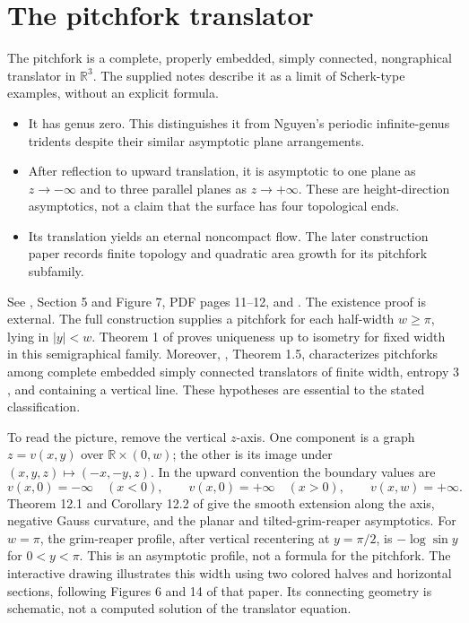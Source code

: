 \chapter{The pitchfork translator}\label{sec:catalogue-pitchfork}
\begin{example}\label{ex:catalogue-pitchfork}
The pitchfork is a complete, properly embedded, simply connected, nongraphical translator in $\mathbb R^3$. The supplied notes describe it as a limit of Scherk-type examples, without an explicit formula.
\begin{itemize}
\item It has genus zero. This distinguishes it from Nguyen's periodic infinite-genus tridents despite their similar asymptotic plane arrangements.
\item After reflection to upward translation, it is asymptotic to one plane as $z\to-\infty$ and to three parallel planes as $z\to+\infty$. These are height-direction asymptotics, not a claim that the surface has four topological ends.
\item Its translation yields an eternal noncompact flow. The later construction paper records finite topology and quadratic area growth for its pitchfork subfamily.
\end{itemize}
See \cite{CatHIMWNotes19}, Section 5 and Figure 7, PDF pages 11--12, and \cite{CatHMW20}. The existence proof is external. The full construction supplies a pitchfork for each half-width $w\geq\pi$, lying in $|y|<w$. Theorem 1 of \cite{CatMSTW26} proves uniqueness up to isometry for fixed width in this semigraphical family. Moreover, \cite{CatGMM25}, Theorem 1.5, characterizes pitchforks among complete embedded simply connected translators of finite width, entropy $3$, and containing a vertical line. These hypotheses are essential to the stated classification.

To read the picture, remove the vertical $z$-axis. One component is a graph $z=v(x,y)$ over $\mathbb R\times(0,w)$; the other is its image under $(x,y,z)\mapsto(-x,-y,z)$. In the upward convention the boundary values are
\[
v(x,0)=-\infty\quad(x<0),\qquad
v(x,0)=+\infty\quad(x>0),\qquad
v(x,w)=+\infty.
\]
Theorem 12.1 and Corollary 12.2 of \cite{CatHMW20} give the smooth extension along the axis, negative Gauss curvature, and the planar and tilted-grim-reaper asymptotics. For $w=\pi$, the grim-reaper profile, after vertical recentering at $y=\pi/2$, is $-\log\sin y$ for $0<y<\pi$. This is an asymptotic profile, not a formula for the pitchfork. The interactive drawing illustrates this width using two colored halves and horizontal sections, following Figures 6 and 14 of that paper. Its connecting geometry is schematic, not a computed solution of the translator equation.
\end{example}


